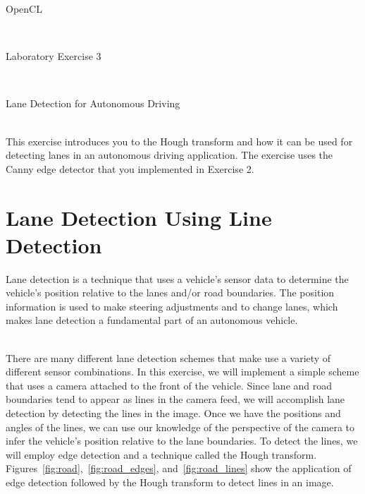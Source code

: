 \documentclass[epsfig,10pt,fullpage]{article}
\newcommand{\LabNum}{3}
\begin{document}
\centerline{\huge OpenCL}
~\\
\centerline{\huge Laboratory Exercise \LabNum}
~\\
\centerline{\large Lane Detection for Autonomous Driving}
~\\

This exercise introduces you to the Hough transform and how it can be used for detecting lanes in an autonomous driving application. 
The exercise uses the Canny edge detector that you implemented in Exercise 2.


\section*{Lane Detection Using Line Detection}

Lane detection is a technique that uses a vehicle's sensor data to
determine the vehicle's position relative to the lanes and/or road boundaries. 
The position information is used to make steering adjustments and to change lanes, which
makes lane detection a fundamental part of an autonomous vehicle.

~\\
There are many different lane detection schemes that make use a variety of different sensor combinations.
In this exercise, we will implement a simple scheme that uses a camera attached to the front of the vehicle. 
Since lane and road boundaries tend to appear as lines in the camera feed, we will accomplish lane detection
by detecting the lines in the image. 
Once we have the positions and angles of the lines, we can use our knowledge of the perspective of the camera 
to infer the vehicle's position relative to the lane boundaries.
To detect the lines, we will employ edge detection and a technique called the {Hough transform}.
Figures~\ref{fig:road},~\ref{fig:road_edges}, and~\ref{fig:road_lines} show the application of edge detection
followed by the Hough transform to detect lines in an image.
\end{document}
